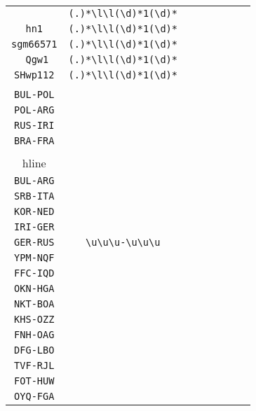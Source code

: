 \begin{longtable}{cccccccc}
\begin{tabular}{ll}
    \verb|+cb441| & \verb|(.)*\l\l(\d)*1(\d)*|\\
\verb|hn1| & \verb|(.)*\l\l(\d)*1(\d)*|\\
\verb|sgm66571| & \verb|(.)*\l\l(\d)*1(\d)*|\\
\verb| Qgw1| & \verb|(.)*\l\l(\d)*1(\d)*|\\
\verb|SHwp112| & \verb|(.)*\l\l(\d)*1(\d)*|
\end{tabular}
\\\midrule 
\begin{tabular}{l}
    \verb|POL-BRA|\\
\verb|BUL-POL|\\
\verb|POL-ARG|\\
\verb|RUS-IRI|\\
\verb|BRA-FRA|\\
\\hline\\
\verb|BUL-ARG|\\
\verb|SRB-ITA|\\
\verb|KOR-NED|\\
\verb|IRI-GER|\\
\verb|GER-RUS|
\end{tabular}

&
\verb|\u\u\u-\u\u\u|
&

\begin{tabular}{l}
    \verb|\u\u\u-\u\u\u|\\
\verb|YPM-NQF|\\
\verb|FFC-IQD|\\
\verb|OKN-HGA|\\
\verb|NKT-BOA|\\
\verb|KHS-OZZ|
\end{tabular}

&

\begin{tabular}{l}
    \verb|\u\u\u-\u\u\u|\\
\verb|FNH-OAG|\\
\verb|DFG-LBO|\\
\verb|TVF-RJL|\\
\verb|FOT-HUW|\\
\verb|OYQ-FGA|
\end{tabular}

&


\end{longtable}
